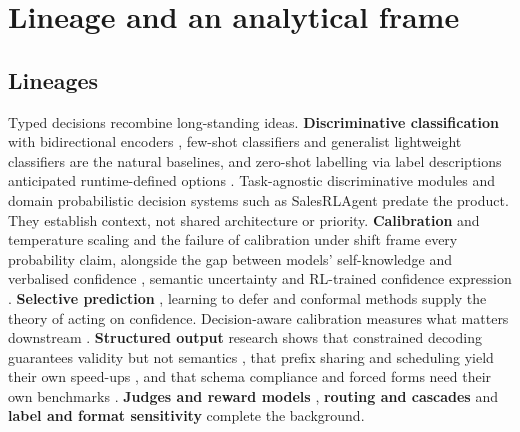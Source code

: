 \section{Lineage and an analytical frame}\label{sec:lineage-and-an-analytical-frame}

\subsection{Lineages}

Typed decisions recombine long-standing ideas. \textbf{Discriminative classification} with bidirectional encoders \citep{arxiv1810_04805,arxiv2412_13663}, few-shot classifiers \citep{arxiv2209_11055} and generalist lightweight classifiers \citep{arxiv2508_07662,arxiv2311_08526} are the natural baselines, and zero-shot labelling via label descriptions anticipated runtime-defined options \citep{arxiv1909_00161}. Task-agnostic discriminative modules \citep{arxiv2306_07536} and domain probabilistic decision systems such as SalesRLAgent \citep{arxiv2503_23303} predate the product. They establish context, not shared architecture or priority. \textbf{Calibration} and temperature scaling \citep{arxiv1706_04599} and the failure of calibration under shift \citep{arxiv1906_02530} frame every probability claim, alongside the gap between models' self-knowledge and verbalised confidence \citep{arxiv2207_05221}, semantic uncertainty \citep{arxiv2302_09664} and RL-trained confidence expression \citep{arxiv2503_02623}. \textbf{Selective prediction} \citep{arxiv1705_08500,arxiv1901_09192}, learning to defer \citep{arxiv2006_01862} and conformal methods \citep{arxiv2107_07511,arxiv2310_05921} supply the theory of acting on confidence. Decision-aware calibration measures what matters downstream \citep{arxiv2404_13503,arxiv2504_15582,arxiv2511_13699,arxiv2510_07750}. \textbf{Structured output} research shows that constrained decoding guarantees validity but not semantics \citep{arxiv2109_05093,arxiv2307_09702,arxiv2411_15100}, that prefix sharing and scheduling yield their own speed-ups \citep{arxiv2312_07104}, and that schema compliance and forced forms need their own benchmarks \citep{arxiv2501_10868,arxiv2604_25359,arxiv2607_20492}. \textbf{Judges and reward models} \citep{arxiv2306_05685,arxiv2310_08491,arxiv2403_13787}, \textbf{routing and cascades} \citep{arxiv2305_05176,arxiv2406_18665,arxiv2601_07206,arxiv2510_01237} and \textbf{label and format sensitivity} \citep{arxiv2309_04992,arxiv2310_11324,arxiv2608_08254} complete the background.


